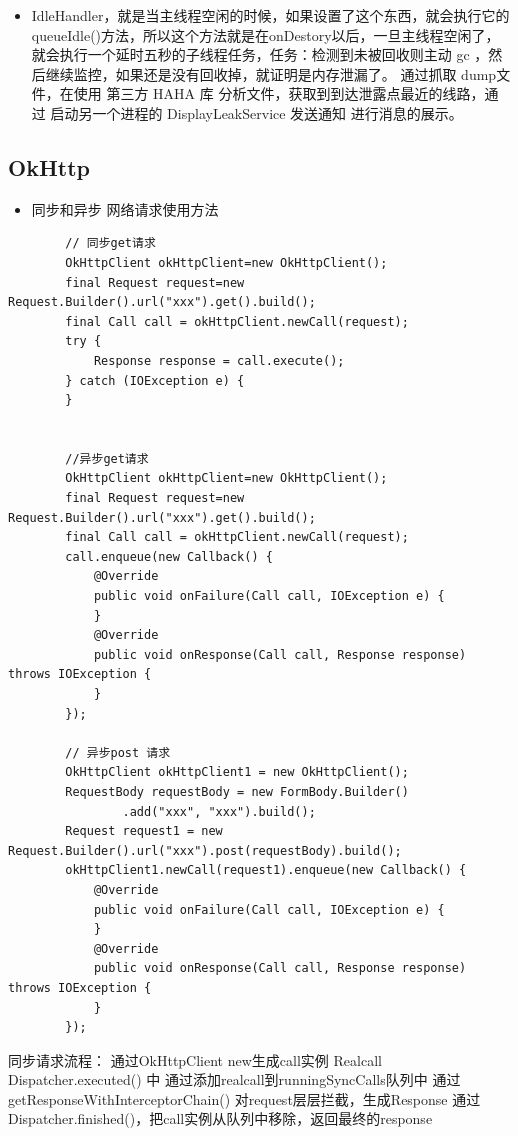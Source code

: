 \documentclass[9pt, b5paper]{article}
\begin{document}
\begin{itemize}
\item IdleHandler，就是当主线程空闲的时候，如果设置了这个东西，就会执行它的queueIdle()方法，所以这个方法就是在onDestory以后，一旦主线程空闲了，就会执行一个延时五秒的子线程任务，任务：检测到未被回收则主动 gc ，然后继续监控，如果还是没有回收掉，就证明是内存泄漏了。 通过抓取 dump文件，在使用 第三方 HAHA 库 分析文件，获取到到达泄露点最近的线路，通过 启动另一个进程的 DisplayLeakService 发送通知 进行消息的展示。
\end{itemize}

\subsection{OkHttp}
\label{sec-9-2}
\begin{itemize}
\item 同步和异步 网络请求使用方法
\end{itemize}
\begin{verbatim}
        // 同步get请求
        OkHttpClient okHttpClient=new OkHttpClient();
        final Request request=new Request.Builder().url("xxx").get().build();
        final Call call = okHttpClient.newCall(request);
        try {
            Response response = call.execute();
        } catch (IOException e) {
        }

        
        //异步get请求 
        OkHttpClient okHttpClient=new OkHttpClient();
        final Request request=new Request.Builder().url("xxx").get().build();
        final Call call = okHttpClient.newCall(request);
        call.enqueue(new Callback() {
            @Override
            public void onFailure(Call call, IOException e) {
            }
            @Override
            public void onResponse(Call call, Response response) throws IOException {
            }
        });

        // 异步post 请求
        OkHttpClient okHttpClient1 = new OkHttpClient();
        RequestBody requestBody = new FormBody.Builder()
                .add("xxx", "xxx").build();
        Request request1 = new Request.Builder().url("xxx").post(requestBody).build();
        okHttpClient1.newCall(request1).enqueue(new Callback() {
            @Override
            public void onFailure(Call call, IOException e) {
            }
            @Override
            public void onResponse(Call call, Response response) throws IOException {
            }
        });
\end{verbatim}
同步请求流程：
通过OkHttpClient new生成call实例 Realcall
Dispatcher.executed() 中 通过添加realcall到runningSyncCalls队列中
通过 getResponseWithInterceptorChain() 对request层层拦截，生成Response
通过Dispatcher.finished()，把call实例从队列中移除，返回最终的response
\end{document}
